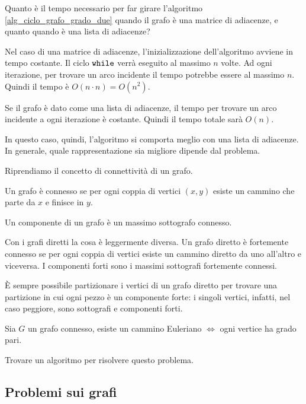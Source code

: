 Quanto \`e il tempo necessario per far girare l'algoritmo \ref{alg_ciclo_grafo_grado_due} quando il grafo \`e una matrice di adiacenze, e quanto quando \`e una lista di adiacenze?

Nel caso di una matrice di adiacenze, l'inizializzazione dell'algoritmo avviene in tempo costante. Il ciclo $\texttt{while}$ verr\`a eseguito al massimo $n$ volte. Ad ogni iterazione, per trovare un arco incidente il tempo potrebbe essere al massimo $n$. Quindi il tempo \`e $O(n \cdot n) = O(n^2)$.

Se il grafo \`e dato come una lista di adiacenze, il tempo per trovare un arco incidente a ogni iterazione \`e costante. Quindi il tempo totale sar\`a $O(n)$.

In questo caso, quindi, l'algoritmo si comporta meglio con una lista di adiacenze. In generale, quale rappresentazione sia migliore dipende dal problema.

Riprendiamo il concetto di connettivit\`a di un grafo.

\begin{defn}
Un grafo \`e connesso se per ogni coppia di vertici $(x, y)$ esiste un cammino che parte da $x$ e finisce in $y$.
\end{defn}

Un componente di un grafo \`e un massimo sottografo connesso.

Con i grafi diretti la cosa \`e leggermente diversa. Un grafo diretto \`e fortemente connesso se per ogni coppia di vertici esiste un cammino diretto da uno all'altro e viceversa. I componenti forti sono i massimi sottografi fortemente connessi.

\`E sempre possibile partizionare i vertici di un grafo diretto per trovare una partizione in cui ogni pezzo \`e un componente forte: i singoli vertici, infatti, nel caso peggiore, sono sottografi e componenti forti.

\begin{theorem}
Sia $G$ un grafo connesso, esiste un cammino Euleriano $\iff$ ogni vertice ha grado pari.
\end{theorem}

\begin{esercizio}
Trovare un algoritmo per risolvere questo problema.
\end{esercizio}

\subsection{Problemi sui grafi}

